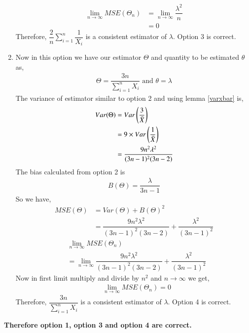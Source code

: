 \documentclass[journal,12pt,twocolumn]{IEEEtran}
\theoremstyle{definition}
\begin{document}
\begin{enumerate}
\begin{align}
     \lim_{n\to\infty} MSE( \Theta_n) &=    \lim_{n\to\infty} \dfrac{\lambda^2}{n} \\
      &= 0
\end{align}
Therefore, $\dfrac{2}{n} \sum_{i=1}^{n} \dfrac{1}{X_i} $ is a consistent estimator of $ \lambda$. 
Option 3 is correct. \\
\item 
 Now in this option we have our estimator $ \Theta$ and quantity to be estimated $ \theta $ as,
 \begin{align}
     \Theta = \dfrac{3n}{\sum_{i=1}^{n} X_i } \text{  and  }
     \theta = \lambda
 \end{align}
 The variance of estimator similar to option 2 and using lemma \ref{varxbar} is,
 \begin{align}
     Var(\Theta) &= Var\left(\dfrac{3}{\Bar{X}}\right)\\
     &= 9 \times Var\left(\dfrac{1}{\Bar{X}}\right)\\
     &=  \dfrac{9n^2\lambda^2}{(3n-1)^2(3n-2)}
 \end{align}
The bias calculated from option 2 is 
\begin{align}
    B(\Theta) = \dfrac{\lambda}{3n-1}
\end{align}
So we have, 
\begin{align}
    MSE(\Theta) &= Var(\Theta) + B(\Theta)^2 \\
    &= \dfrac{9n^2\lambda^2}{(3n-1)^2(3n-2)} + \dfrac{\lambda^2}{(3n-1)^2}
\end{align}
\begin{align}
    & \lim_{n\to\infty} MSE( \Theta_n) \\
     &= \lim_{n\to\infty} \dfrac{9n^2\lambda^2}{(3n-1)^2(3n-2)} + \dfrac{\lambda^2}{(3n-1)^2} 
\end{align}
Now in first limit multiply and divide by $ n^2$ and $ {n\to\infty} $ we get,
\begin{align}
     & \lim_{n\to\infty} MSE( \Theta_n) =0
\end{align}
Therefore, $\dfrac{3n}{\sum_{i=1}^{n} X_i} $ is a consistent estimator of $ \lambda$. 
Option 4 is correct. \\
\end{enumerate}
\textbf{Therefore option 1, option 3 and option 4 are correct.}
\end{document}
